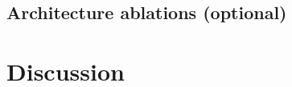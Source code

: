 \documentclass[fleqn,12pt]{wlscirep}
\begin{document}
%
%

\subsection{Architecture ablations (optional)}
\label{sec:ablation}


%

\section{Discussion}
\label{sec:discussion}



\end{document}
